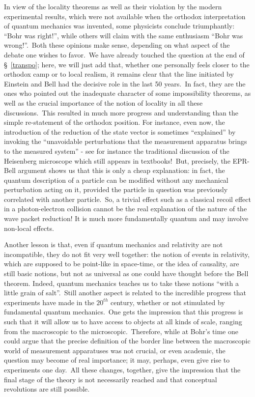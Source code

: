 \documentclass[12pt,onecolumn]{article}%
\begin{document}
In view of the locality theorems as well as their violation by the modern
experimental results, which were not available when the orthodox
interpretation of quantum mechanics was invented, some physicists conclude
triumphantly: ``Bohr was right!'', while others will claim with the same
enthusiasm ``Bohr was wrong!''.\ Both these opinions make sense, depending on
what aspect of the debate one wishes to favor.\ We have already touched the
question at the end of \S \ \ref{transpo}; here, we will just add that,
whether one personally feels closer to the orthodox camp or to local realism,
it remains clear that the line initiated by Einstein and Bell had the decisive
role in the last 50 years.\ In fact, they are the ones who pointed out the
inadequate character of some impossibility theorems, as well as the crucial
importance of the notion of locality in all these discussions.\ This resulted
in much more progress and understanding than the simple re-statement of the
orthodox position. For instance, even now, the introduction of the reduction
of the state vector is sometimes ``explained'' by invoking the ``unavoidable
perturbations that the measurement apparatus brings to the measured system'' -
see for instance the traditional discussion of the Heisenberg microscope which
still appears in textbooks!\ But, precisely, the EPR-Bell argument shows us
that this is only a cheap explanation: in fact, the quantum description of a
particle can be modified without any mechanical perturbation acting on it,
provided the particle in question was previously correlated with another
particle.\ So, a trivial effect such as a classical recoil effect in a
photon-electron collision cannot be the real explanation of the nature of the
wave packet reduction! It is much more fundamentally quantum and may involve
non-local effects.

Another lesson is that, even if quantum mechanics and relativity are not
incompatible, they do not fit very well together: the notion of events in
relativity, which are supposed to be point-like in space-time, or the idea of
causality, are still basic notions, but not as universal as one could have
thought before the Bell theorem. Indeed, quantum mechanics teaches us to take
these notions ``with a little grain of salt''.\ Still another aspect is
related to the incredible progress that experiments have made in the $20^{th}$
century, whether or not stimulated by fundamental quantum mechanics.\ One gets
the impression that this progress is such that it will allow us to have access
to objects at all kinds of scale, ranging from the macroscopic to the
microscopic.\ Therefore, while at Bohr's time one could argue that the precise
definition of the border line between the macroscopic world of measurement
apparatuses was not crucial, or even academic, the question may become of real
importance; it may, perhaps, even give rise to experiments one day.\ All these
changes, together, give the impression that the final stage of the theory is
not necessarily reached and that conceptual revolutions are still possible.
\end{document}
